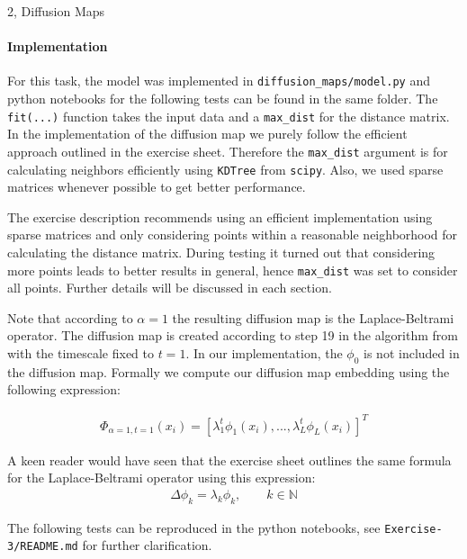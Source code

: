 \begin{task}{2, Diffusion Maps}
\paragraph{Implementation}
For this task, the model was implemented in \verb|diffusion_maps/model.py| and python notebooks for the following tests can be found in the same folder. The \verb|fit(...)| function takes the input data and a \verb|max_dist| for the distance matrix. In the implementation of the diffusion map we purely follow the efficient approach outlined in the exercise sheet. Therefore the \verb|max_dist| argument is for calculating neighbors efficiently using \verb|KDTree| from \verb|scipy|. Also, we used sparse matrices whenever possible to get better performance.

The exercise description recommends using an efficient implementation using sparse matrices and only considering points within a reasonable neighborhood for calculating the distance matrix. During testing it turned out that considering more points leads to better results in general, hence \verb|max_dist| was set to consider all points. Further details will be discussed in each section.

Note that according to \cite{berry2013} $\alpha =1$ the resulting diffusion map is the Laplace-Beltrami operator. The diffusion map is created according to step 19 in the algorithm from \cite{berry2013} with the timescale fixed to $t=1$. In our implementation, the $\phi_0$ is not included in the diffusion map. Formally we compute our diffusion map embedding using the following expression:

\begin{align}
    \Phi_{\alpha =1, t=1}(x_i)=\left[ \lambda_1^t\phi_1 (x_i ),...,\lambda_L^t\phi_L (x_i )\right] ^T \label{diffmap}
\end{align}

A keen reader would have seen that the exercise sheet outlines the same formula for the Laplace-Beltrami operator using this expression:
\begin{align*}
    \Delta\phi_k = \lambda_k\phi_k ,\qquad k\in\mathbb{N}
\end{align*}

The following tests can be reproduced in the python notebooks, see \verb|Exercise-3/README.md| for further clarification.


\end{task}
